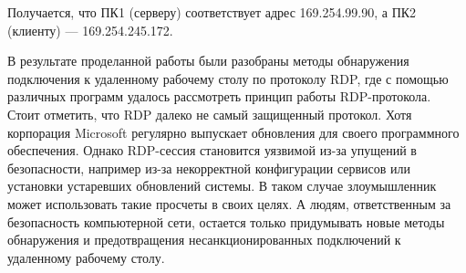 \documentclass[bachelor, och, coursework]{SCWorks}
\begin{document}
  Получается, что ПК1 (серверу) соответствует адрес 169.254.99.90, а ПК2 (клиенту) --- 169.254.245.172.


  \conclusion
  
  В результате проделанной работы были разобраны методы обнаружения подключения к удаленному рабочему столу по протоколу RDP, где с помощью различных программ
  удалось рассмотреть принцип работы RDP-протокола. Стоит отметить, что RDP далеко не самый защищенный протокол. Хотя корпорация Microsoft регулярно
  выпускает обновления для своего программного обеспечения. Однако RDP-сессия становится уязвимой из-за упущений в безопасности, например из-за
  некорректной конфигурации сервисов или установки устаревших обновлений системы. В таком случае злоумышленник может использовать такие просчеты в своих целях.
  А людям, ответственным за безопасность компьютерной сети, остается только придумывать новые методы обнаружения и предотвращения несанкционированных подключений
  к удаленному рабочему столу.
\end{document}
